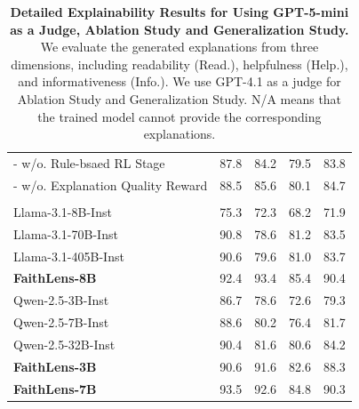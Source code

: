 \begin{table}[t]
{\begin{tabular}{lcccc}
- w/o. Rule-bsaed RL Stage & 87.8 &84.2 &79.5 &83.8 \\
- w/o. Explanation Quality Reward & 88.5 &85.6 &80.1 &84.7 \\
\midrule
\rowcolor{mypink} \multicolumn{5}{c}{\cellcolor{mypink} \textbf{Generalization Study}} \\
Llama-3.1-8B-Inst &  75.3 &72.3 &68.2& 71.9  \\
Llama-3.1-70B-Inst & 90.8 &78.6 &81.2 &83.5  \\
Llama-3.1-405B-Inst & 90.6 &79.6 &81.0 &83.7 \\
\rowcolor{blue!5} \textbf{FaithLens-8B}& {92.4} &{93.4} &{85.4} &{90.4}  \\
\hdashline[2pt/3pt]
Qwen-2.5-3B-Inst & 86.7&78.6&72.6&79.3  \\
Qwen-2.5-7B-Inst & 88.6&80.2&76.4&81.7  \\
Qwen-2.5-32B-Inst &  90.4&81.6&80.6&84.2  \\
\rowcolor{blue!5} \textbf{FaithLens-3B}& {90.6}&{91.6}&{82.6}&{88.3}  \\
\rowcolor{blue!5} \textbf{FaithLens-7B}&  {93.5}&{92.6}&{84.8}&{90.3} \\
\bottomrule
\end{tabular}}
\caption{\textbf{Detailed Explainability Results for Using GPT-5-mini as a Judge, Ablation Study and Generalization Study.} We evaluate the generated explanations from three dimensions, including readability (Read.), helpfulness (Help.), and informativeness (Info.).
We use GPT-4.1 as a judge for Ablation Study and Generalization Study.
N/A means that the trained model cannot provide the corresponding explanations.
}
\label{tb:detailed_exp}
\end{table}
